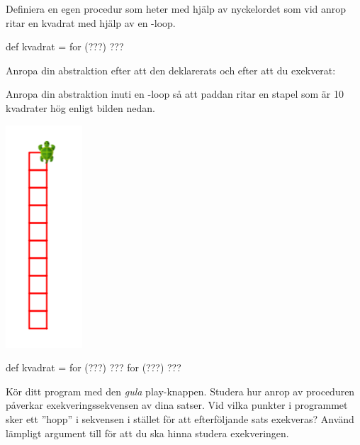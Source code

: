 
\Subtask Definiera en egen procedur som heter  med hjälp av nyckelordet  som vid anrop ritar en kvadrat med hjälp av en -loop.

\begin{Code}
def kvadrat = for (???) {???}
\end{Code}


\Subtask Anropa din abstraktion efter att den deklarerats och efter att du exekverat:\\


\Subtask Anropa din abstraktion inuti en -loop så att paddan ritar en stapel som är 10 kvadrater hög enligt bilden nedan.


\begin{multicols}{2}

\includegraphics[scale=0.5]{../img/kojo/square-column}

\columnbreak

\begin{Code}
def kvadrat = for (???) {???}
for (???) {???}
\end{Code}

\end{multicols}

\Subtask Kör ditt program med den \emph{gula} play-knappen. Studera hur anrop av proceduren  påverkar exekveringssekvensen av dina satser. Vid vilka punkter i programmet sker ett ''hopp'' i sekvensen i stället för att efterföljande sats exekveras? Använd lämpligt argument till  för att du ska hinna studera exekveringen.


